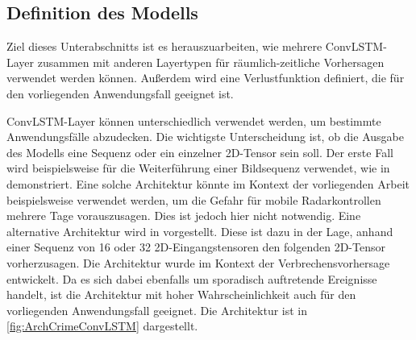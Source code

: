 \subsection{Definition des Modells}
\label{sec:ModellDefinition}
Ziel dieses Unterabschnitts ist es herauszuarbeiten, wie mehrere ConvLSTM-Layer zusammen mit anderen Layertypen für räumlich-zeitliche Vorhersagen verwendet werden können.
Außerdem wird eine Verlustfunktion definiert, die für den vorliegenden Anwendungsfall geeignet ist.

ConvLSTM-Layer können unterschiedlich verwendet werden, um bestimmte Anwendungsfälle abzudecken.
Die wichtigste Unterscheidung ist, ob die Ausgabe des Modells eine Sequenz oder ein einzelner 2D-Tensor sein soll.
Der erste Fall wird beispielsweise für die Weiterführung einer Bildsequenz verwendet, wie in \cite{VideoPredKeras} demonstriert.
Eine solche Architektur könnte im Kontext der vorliegenden Arbeit beispielsweise verwendet werden, um die Gefahr für mobile Radarkontrollen mehrere Tage vorauszusagen.
Dies ist jedoch hier nicht notwendig.
Eine alternative Architektur wird in \cite{CrimeConvLSTM} vorgestellt.
Diese ist dazu in der Lage, anhand einer Sequenz von 16 oder 32 2D-Eingangstensoren den folgenden 2D-Tensor vorherzusagen.
Die Architektur wurde im Kontext der Verbrechensvorhersage entwickelt.
Da es sich dabei ebenfalls um sporadisch auftretende Ereignisse handelt, ist die Architektur mit hoher Wahrscheinlichkeit auch für den vorliegenden Anwendungsfall geeignet.
Die Architektur ist in \autoref{fig:ArchCrimeConvLSTM} dargestellt.

